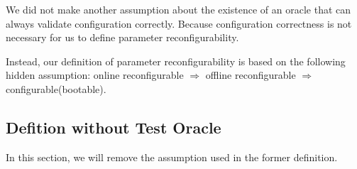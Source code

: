 We did not make another assumption about the existence of an oracle that can always validate configuration correctly. Because  configuration correctness is not necessary for us to define parameter reconfigurability.

Instead, our definition of parameter reconfigurability is based on the following hidden assumption: online reconfigurable $\Longrightarrow$ offline reconfigurable $\Longrightarrow$ configurable(bootable).



\subsection{Defition without Test Oracle}
In this section, we will remove the assumption used in the former definition.












